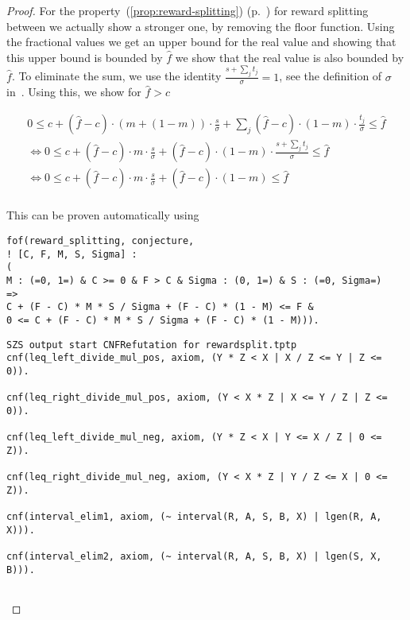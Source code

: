 \begin{proof}
  For the property~(\ref{prop:reward-splitting})
  (p.~\pageref{prop:reward-splitting}) for reward splitting between we actually
  show a stronger one, by removing the floor function. Using the fractional
  values we get an upper bound for the real value and showing that this upper
  bound is bounded by $\hat{f}$ we show that the real value is also bounded by
  $\hat{f}$. To eliminate the sum, we use the identity
  $\frac{s + \sum_{j}t_{j}}{\sigma} = 1$, see the definition of $\sigma$
  in~\cite{delegation_design}. Using this, we show for $\hat{f} > c$

  \begin{multline*}
    0 \leq c + (\hat{f} - c)\cdot (m + (1 - m))\cdot \frac{s}{\sigma} +
    \sum_{j}(\hat{f}-c)\cdot(1-m)\cdot\frac{t_{j}}{\sigma} \leq \hat{f} \\
    \Leftrightarrow
    0\leq c + (\hat{f}-c)\cdot m \cdot \frac{s}{\sigma} + (\hat{f}
    -c)\cdot(1-m)\cdot\frac{s + \sum_{j}t_{j}}{\sigma} \leq \hat{f} \\
    \Leftrightarrow
    0\leq c + (\hat{f}-c)\cdot m \cdot \frac{s}{\sigma} + (\hat{f}
    -c)\cdot(1-m) \leq \hat{f} \\
  \end{multline*}

  This can be proven automatically using

\begin{verbatim}
fof(reward_splitting, conjecture,
! [C, F, M, S, Sigma] :
(
M : (=0, 1=) & C >= 0 & F > C & Sigma : (0, 1=) & S : (=0, Sigma=)
=>
C + (F - C) * M * S / Sigma + (F - C) * (1 - M) <= F &
0 <= C + (F - C) * M * S / Sigma + (F - C) * (1 - M))).
\end{verbatim}

  \ifproofs
\begin{verbatim}
SZS output start CNFRefutation for rewardsplit.tptp
cnf(leq_left_divide_mul_pos, axiom, (Y * Z < X | X / Z <= Y | Z <= 0)).

cnf(leq_right_divide_mul_pos, axiom, (Y < X * Z | X <= Y / Z | Z <= 0)).

cnf(leq_left_divide_mul_neg, axiom, (Y * Z < X | Y <= X / Z | 0 <= Z)).

cnf(leq_right_divide_mul_neg, axiom, (Y < X * Z | Y / Z <= X | 0 <= Z)).

cnf(interval_elim1, axiom, (~ interval(R, A, S, B, X) | lgen(R, A, X))).

cnf(interval_elim2, axiom, (~ interval(R, A, S, B, X) | lgen(S, X, B))).


\end{verbatim}
\end{proof}
